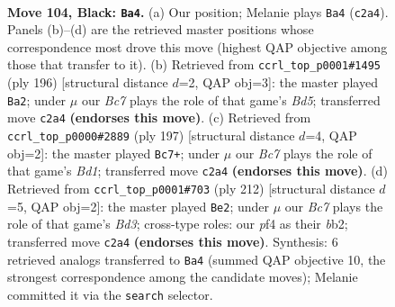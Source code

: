 \documentclass[11pt]{article}
\begin{document}
\clearpage

\begin{figure}[p]\centering
\begin{subfigure}{0.46\textwidth}\centering
\resizebox{\linewidth}{!}{%
\newchessgame
\chessboard[
  setfen={7K/4k3/8/5p2/5P2/8/2b5/8 b - - 23 104},
  showmover=false,
  pgfstyle=straightmove, color=movearrow, markmove={c2-a4}
]}
\caption{}
\end{subfigure}\hfill
\begin{subfigure}{0.46\textwidth}\centering
\resizebox{\linewidth}{!}{%
\newchessgame
\chessboard[
  setfen={8/3k4/8/3Bp3/8/5P2/3K4/6b1 w - - 19 99},
  showmover=false,
  pgfstyle=straightmove, color=movearrow, markmove={d5-a2}
]}
\caption{}
\end{subfigure}
\\[4pt]
\begin{subfigure}{0.46\textwidth}\centering
\resizebox{\linewidth}{!}{%
\newchessgame
\chessboard[
  setfen={3b4/8/1p6/1P1B4/8/6K1/8/6k1 b - - 12 99},
  showmover=false,
  pgfstyle=straightmove, color=movearrow, markmove={d8-c7}
]}
\caption{}
\end{subfigure}\hfill
\begin{subfigure}{0.46\textwidth}\centering
\resizebox{\linewidth}{!}{%
\newchessgame
\chessboard[
  setfen={5k2/8/8/5PP1/8/3B3K/1b6/8 w - - 63 107},
  showmover=false,
  pgfstyle=straightmove, color=movearrow, markmove={d3-e2}
]}
\caption{}
\end{subfigure}
\caption{\textbf{Move 104, Black: \texttt{Ba4}.} (a) Our position; Melanie plays \texttt{Ba4} (\texttt{c2a4}). Panels (b)--(d) are the retrieved master positions whose correspondence most drove this move (highest QAP objective among those that transfer to it). (b) Retrieved from \texttt{ccrl\_top\_p0001\#1495} (ply 196) [structural distance $d$=2, QAP obj=3]: the master played \texttt{Ba2}; under $\mu$ our \emph{Bc7} plays the role of that game's \emph{Bd5}; transferred move \texttt{c2a4} \textbf{(endorses this move)}. (c) Retrieved from \texttt{ccrl\_top\_p0000\#2889} (ply 197) [structural distance $d$=4, QAP obj=2]: the master played \texttt{Bc7+}; under $\mu$ our \emph{Bc7} plays the role of that game's \emph{Bd1}; transferred move \texttt{c2a4} \textbf{(endorses this move)}. (d) Retrieved from \texttt{ccrl\_top\_p0001\#703} (ply 212) [structural distance $d$=5, QAP obj=2]: the master played \texttt{Be2}; under $\mu$ our \emph{Bc7} plays the role of that game's \emph{Bd3}; cross-type roles: our \emph{p}f4 as their \emph{b}b2; transferred move \texttt{c2a4} \textbf{(endorses this move)}. Synthesis: 6 retrieved analogs transferred to \texttt{Ba4} (summed QAP objective 10, the strongest correspondence among the candidate moves); Melanie committed it via the \texttt{search} selector.}
\label{fig:thought-m207}
\end{figure}
\end{document}
